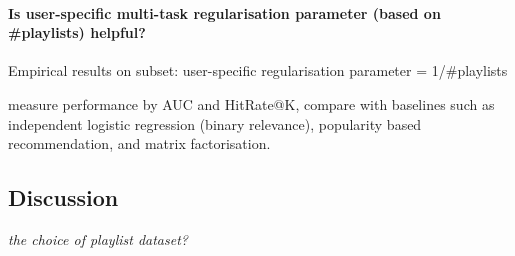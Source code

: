 \paragraph{Is user-specific multi-task regularisation parameter (based on \#playlists) helpful?}
Empirical results on subset: user-specific regularisation parameter = 1/\#playlists \\


\TODO
measure performance by AUC and HitRate@K,
compare with baselines such as independent logistic regression (\ie binary relevance), popularity based recommendation,
and matrix factorisation.



\subsection{Discussion}

{\it the choice of playlist dataset?}
